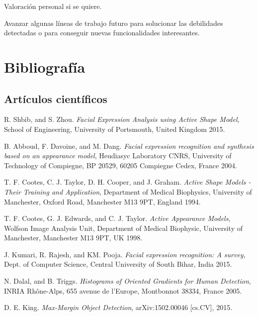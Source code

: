 \documentclass[a4paper,11pt]{book}
\begin{document}
Valoración personal si se quiere.


Avanzar algunas líneas de trabajo futuro para solucionar las debilidades detectadas o para conseguir nuevas funcionalidades interesantes.

\chapter{Bibliografía}
\begin{thebibliography}{99}
	\section{Artículos científicos}
	R. Shbib, and S. Zhou. %
	\textit{Facial Expression Analysis using Active Shape Model}, %
	School of Engineering, University of Portsmouth, United Kingdom	%
	2015.	%
	
	B. Abboud, F. Davoine, and M. Dang. %
	\textit{Facial expression recognition and synthesis based on
		an appearance model}, %
	Heudiasyc Laboratory CNRS, University of Technology of Compiegne, BP 20529, 60205 Compiegne Cedex, France	%
	2004.	%
	
	T. F. Cootes, C. J. Taylor, D. H. Cooper, and J. Graham. %
	\textit{Active Shape Models - Their Training and Application}, %
	Department of Medical Biophysics, University of Manchester, Oxford Road, Manchester M13 9PT, England 	%
	1994.	%
	
	T. F. Cootes, G. J. Edwards, and C. J. Taylor. %
	\textit{Active Appearance Models}, %
	Wolfson Image Analysis Unit, Department of Medical Biophysic, University of Manchester, Manchester M13 9PT, UK %
	1998.	%
	
	J. Kumari, R. Rajesh, and KM. Pooja. %
	\textit{Facial expression recognition: A survey}, %
	Dept. of Computer Science, Central University of South Bihar, India 
	2015.	%
	
	N. Dalal, and B. Triggs. %
	\textit{Histograms of Oriented Gradients for Human Detection}, %
	INRIA Rhône-Alps, 655 avenue de l’Europe, Montbonnot 38334, France
	2005.	%
	
	D. E. King.
	\textit{Max-Margin Object Detection}, %
	arXiv:1502.00046 [cs.CV],
	2015.	%
	

\end{thebibliography}
\end{document}
